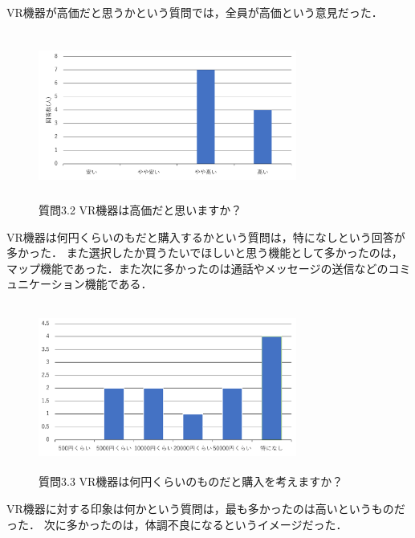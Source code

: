 \documentclass[12pt,a4j]{ltjsarticle}
\begin{document}
VR機器が高価だと思うかという質問では，全員が高価という意見だった．

\begin{figure}[h]
\begin{center}
 \includegraphics[clip,width=85mm,height=55mm]{
 アンケート2_3_2.pdf}
\end{center}
 \caption{質問3.2 VR機器は高価だと思いますか？}
 \label{fig:アンケート2_3_2.pdf}
\end{figure}

VR機器は何円くらいのもだと購入するかという質問は，特になしという回答が多かった．
また選択したか買うたいでほしいと思う機能として多かったのは，マップ機能であった．また次に多かったのは通話やメッセージの送信などのコミュニケーション機能である．

\begin{figure}[h]
\begin{center}
 \includegraphics[clip,width=85mm,height=55mm]{
 アンケート2_3_3.pdf}
\end{center}
 \caption{質問3.3 VR機器は何円くらいのものだと購入を考えますか？}
 \label{fig:アンケート2_3_3.pdf}
\end{figure}

VR機器に対する印象は何かという質問は，最も多かったのは高いというものだった．
次に多かったのは，体調不良になるというイメージだった．
\end{document}
